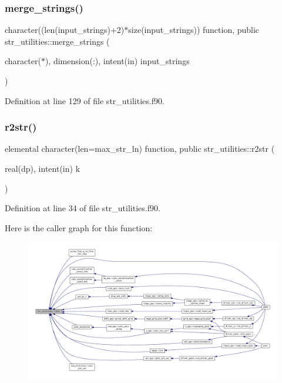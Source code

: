 \subsubsection{\texorpdfstring{merge\+\_\+strings()}{merge\_strings()}}
{\footnotesize\ttfamily character((len(input\+\_\+strings)+2)$\ast$size(input\+\_\+strings)) function, public str\+\_\+utilities\+::merge\+\_\+strings (\begin{DoxyParamCaption}\item[{character($\ast$), dimension(\+:), intent(in)}]{input\+\_\+strings }\end{DoxyParamCaption})}



Definition at line 129 of file str\+\_\+utilities.\+f90.

\mbox{\label{namespacestr__utilities_a92ac6c0af1979df094de1caddd28ade0}} 
\subsubsection{\texorpdfstring{r2str()}{r2str()}}
{\footnotesize\ttfamily elemental character(len=max\+\_\+str\+\_\+ln) function, public str\+\_\+utilities\+::r2str (\begin{DoxyParamCaption}\item[{real(dp), intent(in)}]{k }\end{DoxyParamCaption})}



Definition at line 34 of file str\+\_\+utilities.\+f90.

Here is the caller graph for this function\+:
\nopagebreak
\begin{figure}[H]
\begin{center}
\leavevmode
\includegraphics[width=350pt]{namespacestr__utilities_a92ac6c0af1979df094de1caddd28ade0_icgraph}
\end{center}
\end{figure}
\mbox{\label{namespacestr__utilities_ac778d706b2e021672618939ab58fdd32}} 
